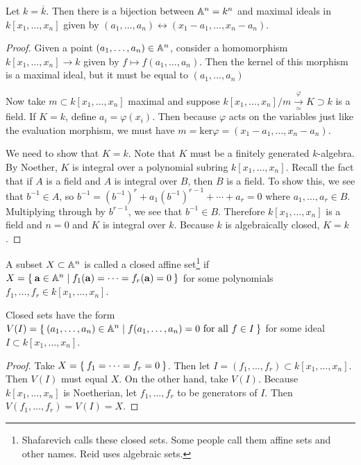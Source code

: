 \documentclass[twoside, 10pt]{article}
\begin{document}
    \begin{thm}
        Let $k = \overline{k}$. Then there is a bijection between $\mathbb{A}^n = k^n$ and maximal ideals in $k[x_1, \ldots, x_n]$ given by $(a_1, \ldots, a_n) \leftrightarrow (x_1-a_1, \ldots, x_n-a_n)$.
        \begin{proof}
            Given a point $(a_1, \ldots, a_n) \in \mathbb{A}^n$, consider a homomorphism $k[x_1, \ldots, x_n] \rightarrow k$ given by $f \mapsto f(a_1, \ldots, a_n)$. Then the kernel of this morphism is a maximal ideal, but it must be equal to $(a_1, \ldots, a_n)$

            Now take $m \subset k[x_1, \ldots, x_n]$ maximal and suppose $k[x_1, \ldots, x_n]/m \xrightarrow[\simeq]{\varphi} K \supset k$ is a field. If $K=k$, define $a_i= \varphi(x_i)$. Then because $\varphi$ acts on the variables just like the evaluation morphism, we must have $m = \mathrm{ker} \varphi = (x_1-a_1, \ldots, x_n-a_n)$. 
            
            We need to show that $K=k$. Note that $K$ must be a finitely generated $k$-algebra. By Noether, $K$ is integral over a polynomial subring $k[x_1, \ldots, x_n]$. Recall the fact that if $A$ is a field and $A$ is integral over $B$, then $B$ is a field. To show this, we see that $b^{-1} \in A$, so $b^{-1} = (b^{-1})^r + a_1(b^{-1})^{r-1} + \cdots + a_r = 0$ where $a_1, \ldots, a_r \in B$. Multiplying through by $b^{r-1}$, we see that $b^{-1} \in B$. Therefore $k[x_1, \ldots, x_n]$ is a field and $n=0$ and $K$ is integral over $k$. Because $k$ is algebraically closed, $K=k$.
        \end{proof}
    \end{thm}

    \begin{defn}
        A subset $X \subset \mathbb{A}^n$ is called a closed affine set\footnote{Shafarevich calls these closed sets. Some people call them affine sets and other names. Reid uses algebraic sets.} if $X = \Set{\mathbf{a} \in \mathbb{A}^n | f_1(\mathbf{a}) = \cdots = f_r(\mathbf{a}) = 0 }$ for some polynomials $f_1, \ldots, f_r \in k[x_1, \ldots, x_n]$. 
    \end{defn}

    \begin{lem}
        Closed sets have the form $V(I) = \Set{(a_1, \ldots, a_n) \in \mathbb{A}^n | f(a_1, \ldots, a_n) = 0 \text{ for all $f \in I$}}$ for some ideal $I \subset k[x_1, \ldots, x_n]$.
        \begin{proof}
            Take $X = \Set{f_1 = \cdots = f_r = 0}$. Then let $I = (f_1, \ldots, f_r) \subset k[x_1, \ldots, x_n]$. Then $V(I)$ must equal $X$. On the other hand, take $V(I)$. Because $k[x_1, \ldots, x_n]$ is Noetherian, let $f_1, \ldots, f_r$ to be generators of $I$. Then $V(f_1, \ldots, f_r) = V(I) = X$.
        \end{proof}
    \end{lem}
\end{document}
